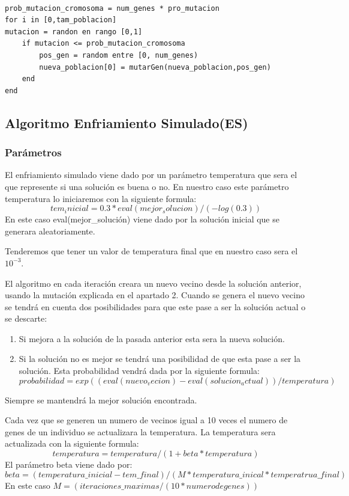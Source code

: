 \documentclass[titlepage]{article}
\begin{document}
	\begin{lstlisting}

prob_mutacion_cromosoma = num_genes * pro_mutacion	
for i in [0,tam_poblacion]
mutacion = randon en rango [0,1]
	if mutacion <= prob_mutacion_cromosoma	
		pos_gen = random entre [0, num_genes)
		nueva_poblacion[0] = mutarGen(nueva_poblacion,pos_gen)
	end	
end
	\end{lstlisting}
	\newpage
	
	\subsection{Algoritmo Enfriamiento Simulado(ES)}
	\subsubsection{Parámetros}
	El enfriamiento simulado viene dado por un parámetro temperatura que sera el que represente si una solución es buena o no. En nuestro caso este parámetro temperatura lo iniciaremos con la siguiente formula:
	$$
		tem_inicial = 0.3 * eval(mejor_solucion)/ (-log(0.3))
	$$
	En este caso eval(mejor\_solución) viene dado por la solución inicial que se generara aleatoriamente.
	
	Tenderemos que tener un valor de temperatura final que en nuestro caso sera el $10^{-3}$.
	
	El algoritmo en cada iteración creara un nuevo vecino desde la solución anterior, usando la mutación explicada en el apartado 2. 
	Cuando se genera el nuevo vecino se tendrá en cuenta dos posibilidades para que este pase a ser la solución actual o se descarte:
	\begin{enumerate}
		\item Si mejora a la solución de la pasada anterior esta sera la nueva solución.
		
		\item Si la solución no es mejor se tendrá una posibilidad de que esta pase a ser la solución. Esta probabilidad vendrá dada por la siguiente formula:
		$$
		probabilidad = exp((eval(nuevo_vecion) - eval(solucion_actual)) / temperatura)
		$$
	\end{enumerate}

	Siempre se mantendrá la mejor solución encontrada.
	
	Cada vez que se generen un numero de vecinos igual a  10 veces el numero de genes de un individuo se actualizara la temperatura. La temperatura sera actualizada con la siguiente formula:
	$$
	temperatura = temperatura / (1 + beta * temperatura)
	$$
	El parámetro beta viene dado por:
	$$
	beta = (temperatura\_inicial - tem\_final)/(M * temperatura\_inical * temperatrua\_final)
	$$
	En este caso $M =(iteraciones\_maximas / (10 * numero de genes))$ 	
	\newline
\end{document}
